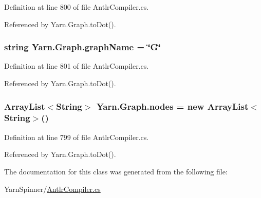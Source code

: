 Definition at line 800 of file Antlr\-Compiler.\-cs.



Referenced by Yarn.\-Graph.\-to\-Dot().

\hypertarget{a00108_a8605f1ec5a4e9cfd07d3ac2be042dac6}{
\subsubsection[{graph\-Name}]{\setlength{\rightskip}{0pt plus 5cm}string Yarn.\-Graph.\-graph\-Name = \char`\"{}G\char`\"{}}}\label{a00108_a8605f1ec5a4e9cfd07d3ac2be042dac6}


Definition at line 801 of file Antlr\-Compiler.\-cs.



Referenced by Yarn.\-Graph.\-to\-Dot().

\hypertarget{a00108_a506df6f737a41748c01239bdea5d82b1}{
\subsubsection[{nodes}]{\setlength{\rightskip}{0pt plus 5cm}Array\-List$<${\bf String}$>$ Yarn.\-Graph.\-nodes = new Array\-List$<${\bf String}$>$()}}\label{a00108_a506df6f737a41748c01239bdea5d82b1}


Definition at line 799 of file Antlr\-Compiler.\-cs.



Referenced by Yarn.\-Graph.\-to\-Dot().



The documentation for this class was generated from the following file\-:\begin{DoxyCompactItemize}
\item 
Yarn\-Spinner/\hyperlink{a00303}{Antlr\-Compiler.\-cs}\end{DoxyCompactItemize}
